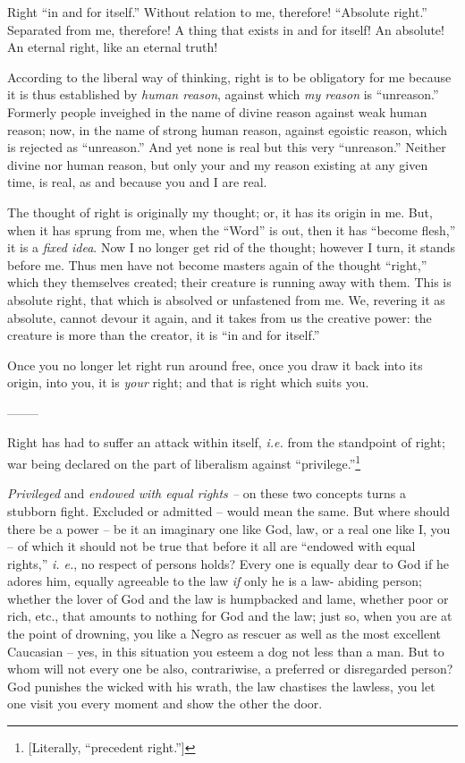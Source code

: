 \documentclass[12pt,a4paper]{book}
\begin{document}
Right ``in and for itself.'' Without relation to me, therefore! ``Absolute 
right.'' Separated from me, therefore! A thing that exists in and for itself! 
An absolute! An eternal right, like an eternal truth!

According to the liberal way of thinking, right is to be obligatory for me 
because it is thus established by \textit{human reason}, against which 
\textit{my reason} is ``unreason.'' Formerly people inveighed in the name of 
divine reason against weak human reason; now, in the name of strong human 
reason, against egoistic reason, which is rejected as ``unreason.'' And yet 
none is real but this very ``unreason.'' Neither divine nor human reason, 
but only your and my reason existing at any given time, is real, as and 
because you and I are real.

The thought of right is originally my thought; or, it has its origin in me. 
But, when it has sprung from me, when the ``Word'' is out, then it has 
``become flesh,'' it is a \textit{fixed idea}. Now I no longer get rid of 
the thought; however I turn, it stands before me. Thus men have not become 
masters again of the thought ``right,'' which they themselves created; their 
creature is running away with them. This is absolute right, that which is 
absolved or unfastened from me. We, revering it as absolute, cannot devour it 
again, and it takes from us the creative power: the creature is more than the 
creator, it is ``in and for itself.''

Once you no longer let right run around free, once you draw it back into its 
origin, into you, it is \textit{your} right; and that is right which suits 
you.

\begin{center}
--------\end{center}


Right has had to suffer an attack within itself, \textit{i.e.} from the 
standpoint of right; war being declared on the part of liberalism against 
``privilege.''\footnote{[Literally, ``precedent right.'']}

\textit{Privileged} and \textit{endowed with equal rights --} on these two 
concepts turns a stubborn fight. Excluded or admitted -- would mean the same. 
But where should there be a power -- be it an imaginary one like God, law, or 
a real one like I, you -- of which it should not be true that before it all 
are ``endowed with equal rights,'' \textit{i. e.}, no respect of persons 
holds? Every one is equally dear to God if he adores him, equally agreeable to 
the law \textit{if} only he is a law- abiding person; whether the lover of God 
and the law is humpbacked and lame, whether poor or rich, etc., that amounts 
to nothing for God and the law; just so, when you are at the point of 
drowning, you like a Negro as rescuer as well as the most excellent Caucasian 
-- yes, in this situation you esteem a dog not less than a man. But to whom 
will not every one be also, contrariwise, a preferred or disregarded person? 
God punishes the wicked with his wrath, the law chastises the lawless, you let 
one visit you every moment and show the other the door.
\end{document}
